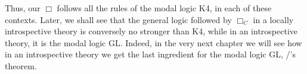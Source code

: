 Thus, our $\Box$ follows all the rules of the modal logic K4, in each of these contexts. Later, we shall see that the general logic followed by $\Box_C$ in a locally introspective theory is conversely no stronger than K4, while in an introspective theory, it is the modal logic GL. Indeed, in the very next chapter we will see how in an introspective theory we get the last ingredient for the modal logic GL, \Loeb/'s theorem.

\fileend